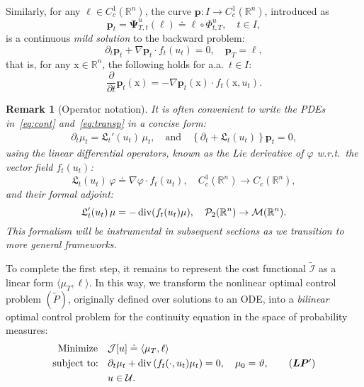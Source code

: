 \documentclass[sn-mathphys-num]{sn-jnl}
\numberwithin{equation}{section}
\theoremstyle{mythm}
\theoremstyle{mydef}
\newtheorem{remark}[proposition]{Remark}
\renewcommand{\phi}{\varphi}
\renewcommand{\div}{\mathop{\rm div}}
\renewcommand{\mathbf}[1]{\bm{#1}}
\begin{document}
Similarly, for any \( \ell \in C^1_c(\mathbb{R}^n) \), the curve \( \bm{p} \colon I \to C^1_c(\mathbb{R}^n) \), introduced as 
\begin{equation}
\label{LCadj}
\bm{p}_t = \bm \Psi^{u}_{T,t}(\ell) \doteq \ell \circ \Phi^{u}_{t,T}, \quad  t \in I,
\end{equation}
is a continuous \emph{mild solution} to the backward problem: %
\begin{equation}
\label{eq:transp}
\partial_t \bm{p}_t + \nabla \bm{p}_t \cdot f_t(u_t) = 0, \quad \bm{p}_T = \ell,
\end{equation}
that is, for any \( \mathrm{x} \in \mathbb{R}^n \), the following holds for a.a.\ \( t \in I \):
\[
\frac{\partial}{\partial t} \bm{p}_t(\mathrm{x}) = -\nabla \bm{p}_t(\mathrm{x}) \cdot f_t(\mathrm{x}, u_t).
\]

\begin{remark}[Operator notation]\label{opr}
It is often convenient to write the PDEs in~\eqref{eq:cont} and~\eqref{eq:transp} in a concise form: 
\begin{align*}
\partial_t \mu_t = \mathfrak{L}_t'(u_t) \, \mu_t,
\quad \text{and} \quad 
\left\{\partial_t + \mathfrak{L}_t(u_t)\right\} \bm{p}_t = 0,
\end{align*}
using the linear differential operators, known as the Lie derivative of \( \phi \) w.r.t.\ the vector field \( f_t(u_t) \):
\[
\mathfrak{L}_t(u_t) \, \phi \doteq \nabla \phi \cdot f_t(u_t), \quad  C^1_c(\mathbb{R}^n) \to C_c(\mathbb{R}^n),
\]
and their formal adjoint:
\[
\mathfrak{L}_t'(u_t) \, \mu = -\div(f_t(u_t)\mu), \quad \mathcal{P}_2(\mathbb{R}^n) \to \mathcal{M}(\mathbb{R}^n).
\]
This formalism will be instrumental in subsequent sections as we transition to more general frameworks.
\end{remark}

To complete the first step, it remains to represent the cost functional \( \widetilde{\mathcal{I}} \) as a linear form \( \langle \mu_T, \ell \rangle \). In this way, we transform the nonlinear optimal control problem \( (\widetilde{P}) \), originally defined over solutions to an ODE, into a \emph{bilinear} optimal control problem for the continuity equation in the space of probability measures:
\begin{align}
\text{Minimize} \quad & \mathcal{J}[u] \doteq \langle \mu_T, \ell \rangle \nonumber \\
\text{subject to: } \ \, & \partial_t \mu_t + \mathrm{div}\left(f_t(\cdot, u_t) \mu_t \right) = 0, \quad \mu_0 = \vartheta, \tag{\(\mathbf{LP}'\)} \\
& u \in \mathcal{U}. \nonumber
\end{align}
\end{document}
